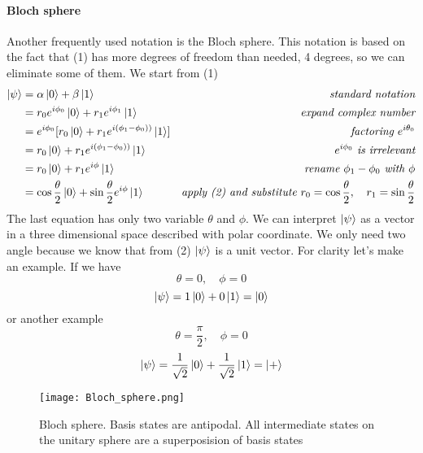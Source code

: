 \documentclass[main.tex]{subfiles}
\theoremstyle{definition}
\begin{document}
		\paragraph{Bloch sphere}
		Another frequently used notation is the Bloch sphere. This notation is based on the fact that (1) has more degrees of 
		freedom than needed, 4 degrees, so we can eliminate some of them. We start from (1)
		\begin{align*}
		\ket{\psi} 
		& =\alpha\ket{0}+\beta\ket{1} 
		& \quad\textit{standard notation}\\
        & =r_0e^{i\phi_0}\ket{0}+r_1e^{i\phi_1}\ket{1} 
        & \quad\textit{expand complex number}\\
        & =e^{i\phi_0}[r_0\ket{0}+r_1e^{i(\phi_1-\phi_0))}\ket{1}]      
        & \quad\textit{factoring }e^{i\theta_0}\\
        & =r_0\ket{0}+r_1e^{i(\phi_1-\phi_0))}\ket{1}     
        & \quad e^{i\phi_0}\textit{ is irrelevant}\\
        & =r_0\ket{0}+r_1e^{i\phi}\ket{1}    
        & \quad\textit{rename }\phi_1-\phi_0\textit{ with }\phi\\
        & =\cos{\frac{\theta}{2}}\ket{0}+\sin{\frac{\theta}{2}}e^{i\phi}\ket{1}
        & \textit{apply (2) and substitute }r_0=\cos{\frac{\theta}{2}},\quad r_1=\sin{\frac{\theta}{2}}\\
        \end{align*}
		The last equation has only two variable $\theta$ and $\phi$. We can interpret $\ket{\psi}$ as a vector in a three
		dimensional space described with polar coordinate. We only need two angle because we know that from (2) $\ket{\psi}$ 
		is a unit vector. For clarity let's make an example. If we have 
		$$\theta=0, \quad \phi=0$$
		$$\ket{\psi} = 1 \ket{0} + 0 \ket{1} = \ket{0}$$
		or another example
		$$\theta=\frac{\pi}{2}, \quad \phi=0$$
		$$\ket{\psi} = \frac{1}{\sqrt{2}} \ket{0} + \frac{1}{\sqrt{2}} \ket{1} = \ket{+}$$
		
		\begin{figure}
		\begin{center}
			\texttt{[image: Bloch\_sphere.png]}
			\caption{Bloch sphere. Basis states are antipodal. All intermediate states on the unitary sphere are a superposision of 
			basis states}
		\end{center}
		\end{figure}
		
\end{document}
